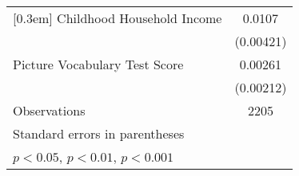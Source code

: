 \documentclass[9pt]{extarticle}
\begin{document}
{\begin{longtable}[l]{l*{1}{c}}
[0.3em]
Childhood Household Income						  &                   0.0107\sym{*}  \\
                                                  &                (0.00421)         \\
[0.3em]
Picture Vocabulary Test Score					  &                  0.00261         \\
                                                  &                (0.00212)         \\
\hline
Observations                                      &                     2205         \\
\hline\hline
\multicolumn{2}{l}{\footnotesize Standard errors in parentheses}\\
\multicolumn{2}{l}{\footnotesize \sym{*} \(p<0.05\), \sym{**} \(p<0.01\), \sym{***} \(p<0.001\)}\\
\end{longtable}
}
\end{document}
